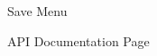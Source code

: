 			\begin{figure}[t]
				\centering
					\caption{Save Menu}
					\label{fig:save}
			\end{figure}
			
			\begin{figure}[t]
				\centering
					\caption{API Documentation Page}
					\label{fig:docs}
			\end{figure}
